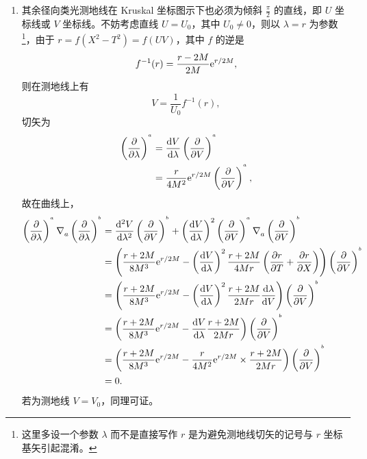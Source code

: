 \begin{xiti}
\begin{zm}
\begin{enumerate}[label = (\arabic*)]
			\item 其余径向类光测地线在 Kruskal 坐标图示下也必须为倾斜 $\frac{\pi}{2}$ 的直线，即 $U$ 坐标线或 $V$ 坐标线。不妨考虑直线 $U = U_0$，其中 $U_0 \neq 0$，则以 $\lambda=r$ 为参数\footnote{这里多设一个参数 $\lambda$ 而不是直接写作 $r$ 是为避免测地线切矢的记号与 $r$ 坐标基矢引起混淆。}，由于 $r = f(X^2 - T^2) = f(UV)$，其中 $f$ 的逆是
			\begin{equation*}
				f^{-1}(r) = \frac{r-2M}{2M} \mathrm{e}^{r/2M},
			\end{equation*}
			则在测地线上有
			\begin{equation*}
				V = \frac{1}{U_0} f^{-1}(r),
			\end{equation*}
			切矢为
				\begin{align*}
					\tensorp{\lambda}{^a} &= \dv{V}{\lambda} \tensorp{V}{^a}\\
					&= \frac{r}{4M^2} \e{r/2M} \tensorp{V}{^a},
				\end{align*}
				故在曲线上，
				\begin{align*}
					\tensorp{\lambda}{^a} \Nabla{a} \tensorp{\lambda}{^b} &= \dv[2]{V}{\lambda} \tensorp{V}{^b} + \left( \dv{V}{\lambda} \right)^2 \tensorp{V}{^a} \Nabla{a} \tensorp{V}{^b}\\
					&= \left( \frac{r+2M}{8M^3} \e{r/2M} - \left( \dv{V}{\lambda} \right)^2 \frac{r+2M}{4Mr} \left( \pdv{r}{T} + \pdv{r}{X} \right) \right) \tensorp{V}{^b}\\
					&= \left( \frac{r+2M}{8M^3} \e{r/2M} - \left( \dv{V}{\lambda} \right)^2 \frac{r+2M}{2Mr} \dv{\lambda}{V} \right) \tensorp{V}{^b}\\
					&= \left( \frac{r+2M}{8M^3} \e{r/2M} - \dv{V}{\lambda} \frac{r+2M}{2Mr} \right) \tensorp{V}{^b}\\
					&= \left( \frac{r+2M}{8M^3} \e{r/2M} - \frac{r}{4M^2} \e{r/2M} \times \frac{r+2M}{2 Mr} \right) \tensorp{V}{^b}\\
					&= 0.
				\end{align*}
				若为测地线 $V = V_0$，同理可证。
		\end{enumerate}
	\end{zm}
\end{xiti}
